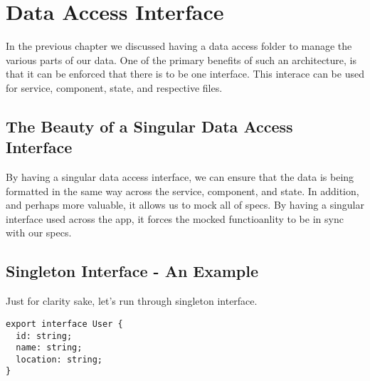\maketitle{}
\section{ Data Access Interface }
In the previous chapter we discussed having a data access folder to manage
the various parts of our data. One of the primary benefits of such an
architecture, is that it can be enforced that there is to be one interface. This
interace can be used for service, component, state, and respective files.

\subsection{ The Beauty of a Singular Data Access Interface }
By having a singular data access interface, we can ensure that the data is
being formatted in the same way across the service, component, and state. In
addition, and perhaps more valuable, it allows us to mock all of specs. By
having a singular interface used across the app, it forces the mocked
functioanlity to be in sync with our specs.

\subsection{ Singleton Interface - An Example }
Just for clarity sake, let's run through singleton interface.
\begin{lstlisting}
export interface User {
  id: string;
  name: string;
  location: string;
}
\end{lstlisting}
